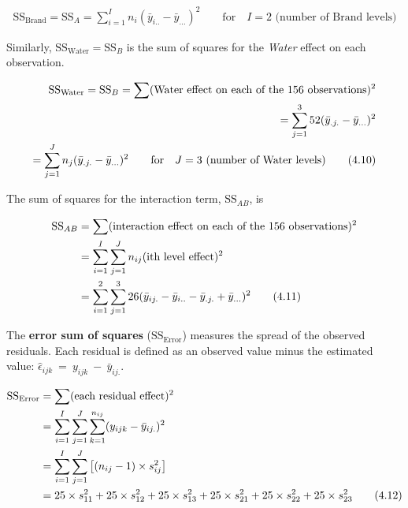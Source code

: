 \documentclass[
]{report}
\begin{document}
\begin{align}
\label{4.9}
\text{SS}_{\text{Brand}} = \text{SS}_A = \sum_{i=1}^{I} n_i(\bar{y}_{i..} - \bar{y}_{...})^2 \qquad \text{for} \quad I=2 \text{ (number of Brand levels)}
\tag{4.9}
\end{align}

Similarly, \(\scriptstyle \text{SS}_{\text{Water}} = \text{SS}_B\) is the sum of squares for the \emph{Water} effect on each observation.

\begin{align}\label{4.10}
\text{SS}_{\text{Water}} = \text{SS}_B = \sum (\text{Water effect on each of the 156 observations})^2 \notag \\
= \sum_{j=1}^{3} 52(\bar{y}_{.j.} - \bar{y}_{...})^2 \notag \\
= \sum_{j=1}^{J} n_j(\bar{y}_{.j.} - \bar{y}_{...})^2 \qquad \text{for} \quad J=3 \text{ (number of Water levels)}
\tag{4.10}
\end{align}

The sum of squares for the interaction term, \(\scriptstyle \text{SS}_{AB}\), is

\begin{align}\label{4.11}
\text{SS}_{AB} &= \sum (\text{interaction effect on each of the 156 observations})^2 \notag \\
&= \sum_{i=1}^{I} \sum_{j=1}^{J} n_{ij} (\text{ith level effect})^2 \notag \\
&= \sum_{i=1}^{2} \sum_{j=1}^{3} 26 (\bar{y}_{ij.} - \bar{y}_{i..} - \bar{y}_{.j.} + \bar{y}_{...})^2
\tag{4.11}
\end{align}

The \textbf{error sum of squares} (\(\scriptstyle \text{SS}_{\text{Error}}\)) measures the spread of the observed residuals. Each residual is defined as an observed value minus the estimated value: \(\scriptstyle \hat{\epsilon}_{ijk} \ =\  y_{ijk} \ -\  \bar{y}_{ij.}\).

\begin{align}\label{4.12}
\text{SS}_{\text{Error}} &= \sum (\text{each residual effect})^2 \notag \\
&= \sum_{i=1}^{I} \sum_{j=1}^{J} \sum_{k=1}^{n_{ij}} (y_{ijk} - \bar{y}_{ij.})^2 \notag \\
&= \sum_{i=1}^{I} \sum_{j=1}^{J} \left[(n_{ij} - 1) \times s_{ij}^2 \right] \notag \\
&= 25 \times s_{11}^2 + 25 \times s_{12}^2 + 25 \times s_{13}^2 + 25 \times s_{21}^2 + 25 \times s_{22}^2 + 25 \times s_{23}^2
\tag{4.12}
\end{align}
\end{document}
